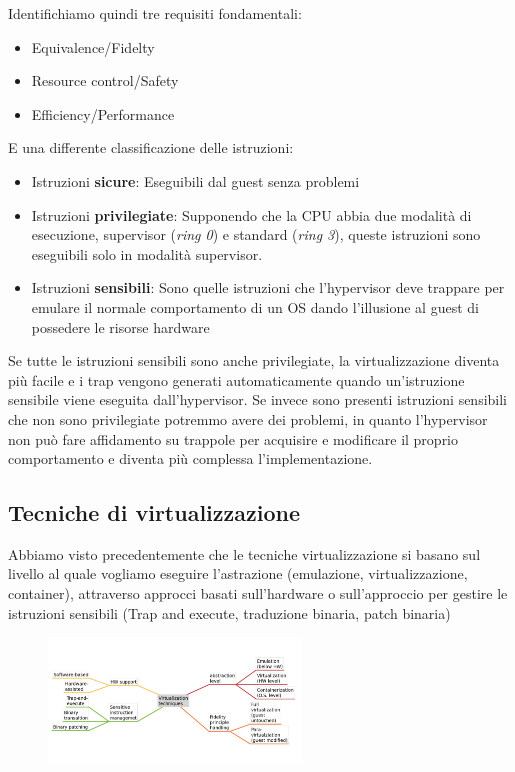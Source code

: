 \documentclass{article}
\begin{document}
		Identifichiamo quindi tre requisiti fondamentali:
		\begin{itemize}
			\item Equivalence/Fidelty
			\item Resource control/Safety
			\item Efficiency/Performance
		\end{itemize}
		E una differente classificazione delle istruzioni:
		\begin{itemize}
		    \item Istruzioni \textbf{sicure}: Eseguibili dal guest senza problemi
		    \item Istruzioni \textbf{privilegiate}: Supponendo che la CPU abbia due modalità di esecuzione, supervisor (\textit{ring 0}) e standard (\textit{ring 3}), queste istruzioni sono eseguibili solo in modalità supervisor.
		    \item Istruzioni \textbf{sensibili}: Sono quelle istruzioni che l'hypervisor deve trappare per emulare il normale comportamento di un OS dando l'illusione al guest di possedere le risorse hardware
		\end{itemize}
		Se tutte le istruzioni sensibili sono anche privilegiate, la virtualizzazione diventa più facile e i trap vengono generati automaticamente quando un'istruzione sensibile viene eseguita dall'hypervisor. Se invece sono presenti istruzioni sensibili che non sono privilegiate potremmo avere dei problemi, in quanto l'hypervisor non può fare affidamento su trappole per acquisire e modificare il proprio comportamento e diventa più complessa l'implementazione. 
		
		\newpage
		\subsection{Tecniche di virtualizzazione}
		Abbiamo visto precedentemente che le tecniche virtualizzazione si basano sul livello al quale vogliamo eseguire l'astrazione (emulazione, virtualizzazione, container), 
		attraverso approcci basati sull'hardware o sull'approccio per gestire le istruzioni sensibili (Trap and execute, traduzione binaria, patch binaria)
		\begin{figure}[ht]
		    \centering
		    \includegraphics[width=0.6\textwidth]{SAC_B1_virtualizationTechnicques.png}
		\end{figure}
		
\end{document}
